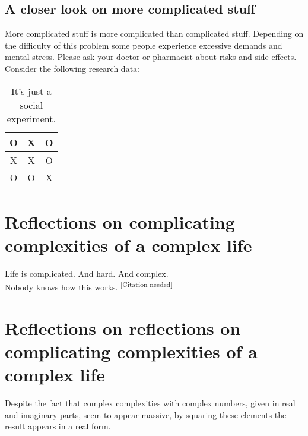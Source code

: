 \documentclass{article}
\begin{document}
	\subsection{A closer look on more complicated stuff}
	More complicated stuff is more complicated than complicated stuff.
	Depending on the difficulty of this problem some people experience excessive demands and mental stress.
	Please ask your doctor or pharmacist about risks and side effects.
	Consider the following research data:
	\begin{center}
		\begin{table}[h]
			\centering
			\begin{tabular}{| c | c | c |}
				\hline
				O & X & O \\ \hline
				X & X & O \\ \hline
				O & O & X \\ \hline
			\end{tabular}
			\caption{It's just a social experiment.}
		\end{table}
	\end{center}
	
	\newpage
	
	\section{Reflections on complicating complexities of a complex life}	
	Life is complicated. And hard. And complex.\\
	Nobody knows how this works. 
	\textsuperscript{[Citation needed]}
	
	\section{Reflections on reflections on complicating complexities of a complex life}	
	Despite the fact that complex complexities with complex numbers, given in real and imaginary parts, seem to appear massive, by squaring these elements the result appears in a real form.
	
\end{document}
